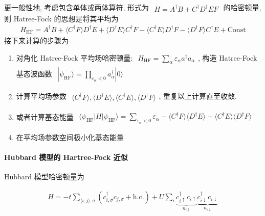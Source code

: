 \documentclass[../../main.tex]{subfiles}
\begin{document}
更一般性地, 考虑包含单体或两体算符, 形式为
$\begin{aligned}
  H = A^{\dagger}B + C^{\dagger}D^{\dagger}EF
\end{aligned}$
的哈密顿量, 则 Hatree-Fock 的思想是将其平均为
\begin{align*}
  H_{\text{HF}} = A^{\dagger}B + \langle C^{\dagger}F\rangle D^{\dagger}E + \langle D^{\dagger}E\rangle C^{\dagger}F - \langle C^{\dagger}E\rangle D^{\dagger}F - \langle D^{\dagger}F\rangle C^{\dagger}E + \text{Const}
\end{align*}
接下来计算的步骤为
\begin{enumerate}
  \item 对角化 Hatree-Fock 平均场哈密顿量: $\begin{aligned}
    H_{\text{HF}} = \sum_{\alpha}\varepsilon_{\alpha}a^{\dagger}a_{\alpha}
  \end{aligned}$, 构造 Hatree-Fock 基态波函数 $\begin{aligned}
    |\psi_{\text{HF}}\rangle = \prod_{\varepsilon_{\alpha}<0}a_{\alpha}^{\dagger}|0\rangle
  \end{aligned}$
  \item 计算平均场参数 $\begin{aligned}
    \langle C^{\dagger}F\rangle, \langle D^{\dagger}E\rangle, \langle C^{\dagger}E\rangle, \langle D^{\dagger}F\rangle
  \end{aligned}$, 重复以上计算直至收敛.
  \item 或者计算基态能量 $\begin{aligned}
    \langle\psi_{\text{HF}}|H|\psi_{\text{HF}}\rangle = \sum_{\varepsilon_{\alpha}<0}\varepsilon_{\alpha} - \langle C^{\dagger}F\rangle\langle D^{\dagger}E\rangle + \langle C^{\dagger}E\rangle\langle D^{\dagger}F\rangle
  \end{aligned}$
  \item 在平均场参数空间极小化基态能量
\end{enumerate}
\paragraph{Hubbard 模型的 Hartree-Fock 近似}

Hubbard 模型哈密顿量为 

\begin{align*}
  H = -t\sum_{\langle i,j\rangle,\sigma}\left(c_{i,\sigma}^{\dagger}c_{j,\sigma} + \text{h.c.}\right) + U\sum_{i}\underbrace{c_{i\uparrow}^{\dagger}c_{i\uparrow}}_{n_{i\uparrow}}\underbrace{c_{i\downarrow}^{\dagger}c_{i\downarrow}}_{n_{i\downarrow}}
\end{align*}
\end{document}
